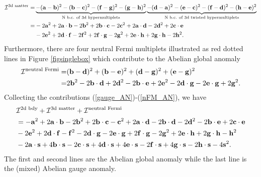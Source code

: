\documentclass{article}
\numberwithin{equation}{section}
\begin{document}
\begin{align}
\label{3d_AN}
\mathcal{I}^{\textrm{3d matter}}=&
\underbrace{
-({\bf a}-{\bf b})^{2}
-({\bf b}-{\bf c})^{2}
-({\bf f}-{\bf g})^{2}
-({\bf g}-{\bf h})^{2}
}_{\textrm{N b.c. of 3d hypermultiplets}}
\underbrace{
-({\bf d}-{\bf a})^{2}
-({\bf e}-{\bf c})^{2}
-({\bf f}-{\bf d})^{2}
-({\bf h}-{\bf e})^{2}
}_{\textrm{N b.c. of 3d twisted hypermultiplets}}
\nonumber\\
=&-2{\bf a}^2
+2{\bf a}\cdot {\bf b}
-2{\bf b}^{2}
+2{\bf b}\cdot {\bf c}
-2{\bf c}^{2}
+2{\bf a}\cdot {\bf d}
-2{\bf d}^{2}
+2{\bf c}\cdot {\bf e}
\nonumber\\
&
-2{\bf e}^{2}
+2{\bf d}\cdot {\bf f}
-2{\bf f}^{2}
+2{\bf f}\cdot {\bf g}
-2{\bf g}^{2}
+2{\bf e}\cdot {\bf h}
+2{\bf g}\cdot {\bf h}
-2{\bf h}^{2}. 
\end{align}
Furthermore, there are four neutral Fermi multiplets 
illustrated as red dotted lines in Figure \ref{figsinglebox} which contribute to the Abelian global anomaly
\begin{align}
\label{nFM_AN}
\mathcal{I}^{\textrm{neutral Fermi}}=&
({\bf b}-{\bf d})^2
+({\bf b}-{\bf e})^2
+({\bf d}-{\bf g})^2
+({\bf e}-{\bf g})^2
\nonumber\\
=&2{\bf b}^2
-2{\bf b}\cdot {\bf d}
+2{\bf d}^2
-2{\bf b}\cdot {\bf e}
+2{\bf e}^2
-2{\bf d}\cdot {\bf g}
-2{\bf e}\cdot {\bf g}
+2{\bf g}^{2}. 
\end{align}
Collecting the contributions 
(\ref{gauge_AN})-(\ref{nFM_AN}), 
we have 
\begin{align}
\label{miss_AN}
&\mathcal{I}^{\textrm{2d bdy}}+
\mathcal{I}^{\textrm{3d matter}}+
\mathcal{I}^{\textrm{neutral Fermi}}
\nonumber\\
&=
-{\bf a}^2
+2{\bf a}\cdot {\bf b}
-2{\bf b}^2
+2{\bf b}\cdot {\bf c}
-{\bf c}^2
+2{\bf a}\cdot {\bf d}
-2{\bf b}\cdot {\bf d}
-2{\bf d}^2
-2{\bf b}\cdot {\bf e}
+2{\bf c}\cdot {\bf e}
\nonumber\\
&-2{\bf e}^{2}
+2{\bf d}\cdot {\bf f}
-{\bf f}^2
-2{\bf d}\cdot {\bf g}
-2{\bf e}\cdot {\bf g}
+2{\bf f}\cdot {\bf g}
-2{\bf g}^2
+2{\bf e}\cdot {\bf h}
+2{\bf g}\cdot {\bf h}
-{\bf h}^2
\nonumber\\
&
-2{\bf a}\cdot {\bf s}
+4{\bf b}\cdot {\bf s}
-2{\bf c}\cdot {\bf s}
+4{\bf d}\cdot {\bf s}
+4{\bf e}\cdot {\bf s}
-2{\bf f}\cdot {\bf s}
+4{\bf g}\cdot {\bf s}
-2{\bf h}\cdot {\bf s}
-4{\bf s}^{2}. 
\end{align}
The first and second lines are the Abelian global anomaly 
while the last line is the (mixed) Abelian gauge anomaly. 
\end{document}
